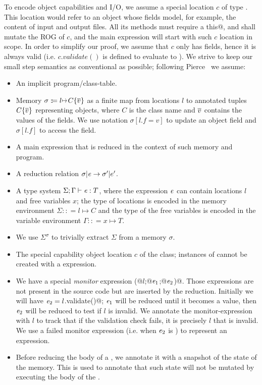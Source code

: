To encode object capabilities and I/O, we assume a special location
$c$ of type \Q@Cap@.
This location would refer to an object whose fields model, for example, the content of input and output files.
All its methods must require a \Q@mut this@, and shall mutate the ROG of $c$, and the main expression will start with
such $c$ location in scope. In order to simplify our proof, we assume that $c$ only has \Q@mut@ fields, hence it is always valid (i.e. $c.validate()$ is defined to evaluate to \Q@true@).
We strive to keep our small step semantics as conventional as possible; following Pierce~\cite{pierce2002types} we assume:
\begin{itemize}
\item An implicit program/class-table.
\item Memory $\sigma:\!:\!= l\mapsto C\{\Many{v}\}$ as a finite map from locations $l$ to annotated tuples $C\{\hspace{0.03ex} \overline{\hspace{-0.03ex}v\hspace{-0.03ex}} \hspace{0.03ex}\}$ representing objects,
where $C$ is the class name and $\hspace{0.03ex} \overline{\hspace{-0.03ex}v\hspace{-0.03ex}} \hspace{0.03ex}$ contains the values of the fields.
We use notation $\sigma[l.f=v]$ to update an object field and $\sigma[l.f]$ to access the field.
\item A main expression that is reduced in the context of such memory and program.
\item A reduction relation $\sigma|\e\rightarrow \sigma'|e'$.
\item A type system $\Sigma;\Gamma\vdash\e:T$, where 
the expression ${\mathit{e}}$ can contain locations $l$ and free variables $x$;
the type of locations is encoded in the memory environment $\Sigma:\!:\!= l\mapsto C$
and the type of the free variables is encoded in the variable environment $\Gamma:\!:\!= x\mapsto T$.
\item We use $\Sigma^\sigma$ to trivially extract $\Sigma$ from a memory $\sigma$.
\item The special capability object location $c$ of the \Q@Cap@ class; instances of \Q@Cap@ cannot be created with a \Q@new@ expression.
\item We have a special \emph{monitor} expression \Q@M(@$l$\Q@;@${\mathit{e}}_1$\Q@;@${\mathit{e}}_2$\Q@)@.
Those expressions are not present in the source code but are inserted by the reduction.
Initially we will have ${\mathit{e}}_2= l$\Q@.validate()@;
${\mathit{e}}_1$ will be reduced until it becomes a value, then
${\mathit{e}}_2$ will be reduced to test if $l$ is invalid. We annotate the monitor-expression with $l$ to track
that if the validation check fails, it is precisely $l$ that is invalid.
We use a failed monitor expression (i.e. when ${\mathit{e}}_2$ is \Q@false@) to represent an \Q@error@ expression.
\item Before reducing the body of a \Q@try@, we annotate it with a snapshot of 
the state of the memory. This is used to annotate that such state will not be mutated by executing the body of the \Q@try@.
\end{itemize}

